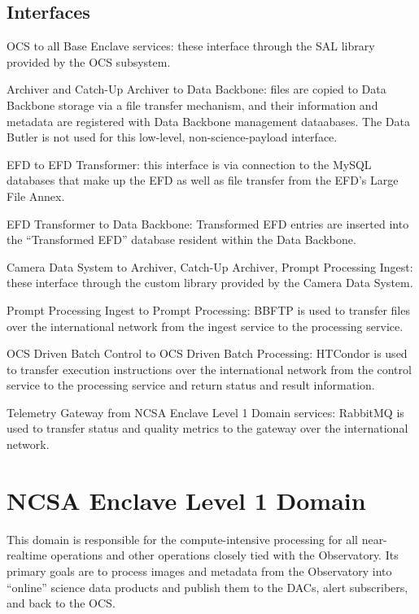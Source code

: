 \documentclass[DM,lsstdraft,toc]{lsstdoc}
\begin{document}
\subsection{Interfaces}\label{interfaces}

OCS to all Base Enclave services: these interface through the SAL
library provided by the OCS subsystem.

Archiver and Catch-Up Archiver to Data Backbone: files are copied to
Data Backbone storage via a file transfer mechanism, and their
information and metadata are registered with Data Backbone management
dataabases. The Data Butler is not used for this low-level,
non-science-payload interface.

EFD to EFD Transformer: this interface is via connection to the MySQL
databases that make up the EFD as well as file transfer from the EFD's
Large File Annex.

EFD Transformer to Data Backbone: Transformed EFD entries are inserted
into the ``Transformed EFD'' database resident within the Data Backbone.

Camera Data System to Archiver, Catch-Up Archiver, Prompt Processing
Ingest: these interface through the custom library provided by the
Camera Data System.

Prompt Processing Ingest to Prompt Processing: BBFTP is used to transfer
files over the international network from the ingest service to the
processing service.

OCS Driven Batch Control to OCS Driven Batch Processing: HTCondor is
used to transfer execution instructions over the international network
from the control service to the processing service and return status and
result information.

Telemetry Gateway from NCSA Enclave Level 1 Domain services: RabbitMQ is
used to transfer status and quality metrics to the gateway over the
international network.

\section{NCSA Enclave Level 1 Domain}\label{ncsa-enclave-level-1-domain}

This domain is responsible for the compute-intensive processing for all
near-realtime operations and other operations closely tied with the
Observatory. Its primary goals are to process images and metadata from
the Observatory into ``online'' science data products and publish them
to the DACs, alert subscribers, and back to the OCS.
\end{document}
